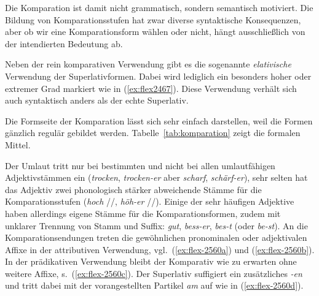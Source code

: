 Die Komparation ist damit nicht grammatisch, sondern semantisch motiviert.
Die Bildung von Komparationsstufen hat zwar diverse syntaktische Konsequenzen, aber ob wir eine Komparationsform wählen oder nicht, hängt ausschließlich von der intendierten Bedeutung ab.

Neben der rein komparativen Verwendung gibt es die sogenannte \textit{elativische} Verwendung der Superlativformen.
Dabei wird lediglich ein besonders hoher oder extremer Grad markiert wie in (\ref{ex:flex2467}).
Diese Verwendung verhält sich auch syntaktisch anders als der echte Superlativ.

\begin{exe}
\end{exe}


Die Formseite der Komparation lässt sich sehr einfach darstellen, weil die Formen gänzlich regulär gebildet werden.
Tabelle~\ref{tab:komparation} zeigt die formalen Mittel.

\begin{table}[!htbp]
  \centering
  \caption{Affixe der Komparation}
  \label{tab:komparation}
\end{table}

Der Umlaut tritt nur bei bestimmten und nicht bei allen umlautfähigen Adjektivstämmen ein (\textit{trocken}, \textit{trocken-er} aber \textit{scharf}, \textit{schärf-er}), sehr selten hat das Adjektiv zwei phonologisch stärker abweichende Stämme für die Komparationsstufen (\textit{hoch} //, \textit{höh-er} //).
Einige der sehr häufigen Adjektive haben allerdings eigene Stämme für die Komparationsformen, zudem mit unklarer Trennung von Stamm und Suffix: \textit{gut}, \textit{bess-er}, \textit{bes-t} (oder \textit{be-st}).
An die Komparationsendungen treten die gewöhnlichen pronominalen oder adjektivalen Affixe in der attributiven Verwendung, vgl.\ (\ref{ex:flex-2560a}) und (\ref{ex:flex-2560b}).
In der prädikativen Verwendung bleibt der Komparativ wie zu erwarten ohne weitere Affixe, s.\ (\ref{ex:flex-2560c}).
Der Superlativ suffigiert ein zusätzliches \textit{-en} und tritt dabei mit der vorangestellten Partikel \textit{am} auf wie in (\ref{ex:flex-2560d}).


